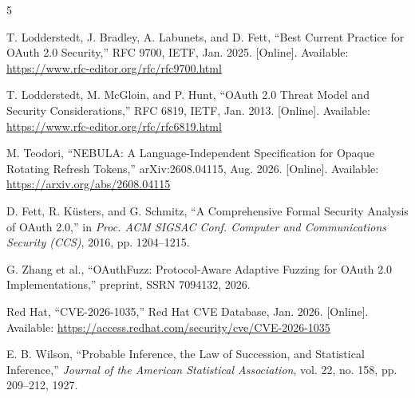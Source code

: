 \documentclass[conference]{IEEEtran}
\begin{document}
\begin{thebibliography}{5}

T. Lodderstedt, J. Bradley, A. Labunets, and D. Fett, ``Best Current
Practice for OAuth 2.0 Security,'' RFC 9700, IETF, Jan. 2025. [Online].
Available: \url{https://www.rfc-editor.org/rfc/rfc9700.html}

T. Lodderstedt, M. McGloin, and P. Hunt, ``OAuth 2.0 Threat Model and
Security Considerations,'' RFC 6819, IETF, Jan. 2013. [Online]. Available:
\url{https://www.rfc-editor.org/rfc/rfc6819.html}

M. Teodori, ``NEBULA: A Language-Independent Specification for Opaque
Rotating Refresh Tokens,'' arXiv:2608.04115, Aug. 2026. [Online].
Available: \url{https://arxiv.org/abs/2608.04115}

D. Fett, R. K\"usters, and G. Schmitz, ``A Comprehensive Formal Security
Analysis of OAuth 2.0,'' in \emph{Proc. ACM SIGSAC Conf. Computer and
Communications Security (CCS)}, 2016, pp. 1204--1215.

G. Zhang et al., ``OAuthFuzz: Protocol-Aware Adaptive Fuzzing for OAuth
2.0 Implementations,'' preprint, SSRN 7094132, 2026.

Red Hat, ``CVE-2026-1035,'' Red Hat CVE Database, Jan. 2026. [Online].
Available: \url{https://access.redhat.com/security/cve/CVE-2026-1035}

E. B. Wilson, ``Probable Inference, the Law of Succession, and Statistical
Inference,'' \emph{Journal of the American Statistical Association},
vol. 22, no. 158, pp. 209--212, 1927.

\end{thebibliography}
\end{document}
